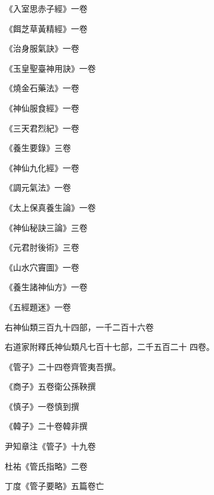 \begin{pinyinscope}
 《入室思赤子經》一卷



 《餌芝草黃精經》一卷



 《治身服氣訣》一卷



 《玉皇聖臺神用訣》一卷



 《燒金石藥法》一卷



 《神仙服食經》一卷



 《三天君烈紀》一卷



 《養生要錄》三卷



 《神仙九化經》一卷



 《調元氣法》一卷



 《太上保真養生論》一卷



 《神仙秘訣三論》三卷



 《元君肘後術》三卷



 《山水穴竇圖》一卷



 《養生諸神仙方》一卷



 《五經題迷》一卷



 右神仙類三百九十四部，一千二百十六卷



 右道家附釋氏神仙類凡七百十七部，二千五百二十
 四卷。



 《管子》二十四卷齊管夷吾撰。



 《商子》五卷衛公孫鞅撰



 《慎子》一卷慎到撰



 《韓子》二十卷韓非撰



 尹知章注《管子》十九卷



 杜祐《管氏指略》二卷



 丁度《管子要略》五篇卷亡




\end{pinyinscope}
